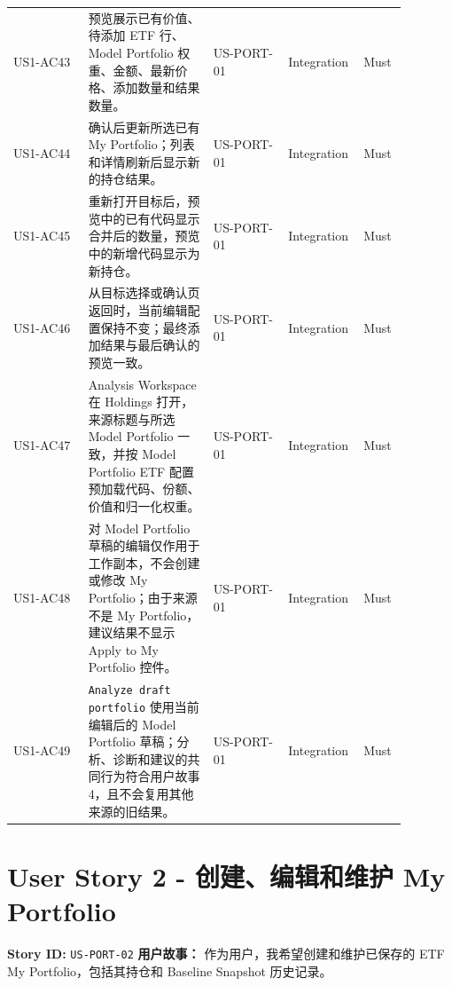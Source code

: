 \begin{longtable}{L{0.18\linewidth}L{0.30\linewidth}L{0.18\linewidth}L{0.12\linewidth}L{0.10\linewidth}}
US1-AC43 & 预览展示已有价值、待添加 ETF 行、Model Portfolio 权重、金额、最新价格、添加数量和结果数量。 & US-PORT-01 & Integration & Must \\
US1-AC44 & 确认后更新所选已有 My Portfolio；列表和详情刷新后显示新的持仓结果。 & US-PORT-01 & Integration & Must \\
US1-AC45 & 重新打开目标后，预览中的已有代码显示合并后的数量，预览中的新增代码显示为新持仓。 & US-PORT-01 & Integration & Must \\
US1-AC46 & 从目标选择或确认页返回时，当前编辑配置保持不变；最终添加结果与最后确认的预览一致。 & US-PORT-01 & Integration & Must \\
US1-AC47 & Analysis Workspace 在 Holdings 打开，来源标题与所选 Model Portfolio 一致，并按 Model Portfolio ETF 配置预加载代码、份额、价值和归一化权重。 & US-PORT-01 & Integration & Must \\
US1-AC48 & 对 Model Portfolio 草稿的编辑仅作用于工作副本，不会创建或修改 My Portfolio；由于来源不是 My Portfolio，建议结果不显示 Apply to My Portfolio 控件。 & US-PORT-01 & Integration & Must \\
US1-AC49 & \texttt{Analyze draft portfolio} 使用当前编辑后的 Model Portfolio 草稿；分析、诊断和建议的共同行为符合用户故事 4，且不会复用其他来源的旧结果。 & US-PORT-01 & Integration & Must \\
\bottomrule
\end{longtable}
\endgroup
\prdhr
\hypertarget{us-port-02}{}
\section{User Story 2 - 创建、编辑和维护 My Portfolio}
\textbf{Story ID:} \texttt{US-PORT-02}
\textbf{用户故事：} 作为用户，我希望创建和维护已保存的 ETF My Portfolio，包括其持仓和 Baseline Snapshot 历史记录。
